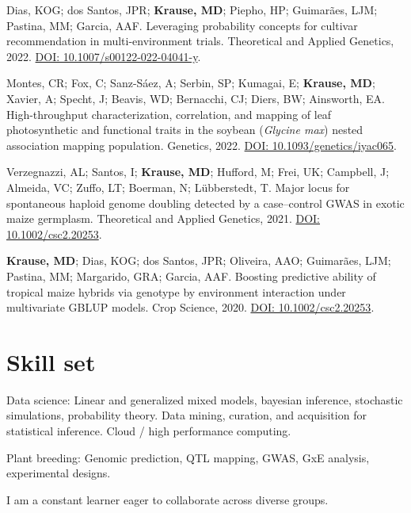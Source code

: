 \documentclass[]{mdkrause_cv_openfont}
\begin{document}
\begin{minipage}[t]{1\textwidth} 


Dias, KOG; dos Santos, JPR; \textbf{Krause, MD}; Piepho, HP; Guimarães, LJM; Pastina, MM; Garcia, AAF. Leveraging probability concepts for cultivar recommendation in multi-environment trials. Theoretical and Applied Genetics, 2022. \href{https://link.springer.com/article/10.1007/s00122-022-04041-y}{DOI: 10.1007/s00122-022-04041-y}. \ExternalLink 

\sectionsep
Montes, CR; Fox, C; Sanz-Sáez, A; Serbin, SP; Kumagai, E; \textbf{Krause, MD}; Xavier, A; Specht, J; Beavis, WD; Bernacchi, CJ; Diers, BW; Ainsworth, EA. High-throughput characterization, correlation, and mapping of leaf photosynthetic and functional traits in the soybean (\textit{Glycine max}) nested association mapping population. Genetics, 2022. \href{https://academic.oup.com/genetics/advance-article/doi/10.1093/genetics/iyac065/6572345?login=true}{DOI: 10.1093/genetics/iyac065}. \ExternalLink

\sectionsep
Verzegnazzi, AL; Santos, I; \textbf{Krause, MD}; Hufford, M; Frei, UK; Campbell, J; Almeida, VC; Zuffo, LT; Boerman, N; Lübberstedt, T. Major locus for spontaneous haploid genome doubling detected by a case–control GWAS in exotic maize germplasm. Theoretical and Applied Genetics, 2021. \href{https://link.springer.com/article/10.1007/s00122-021-03780-8}{DOI: 10.1002/csc2.20253}. \ExternalLink 

\sectionsep
\textbf{Krause, MD}; Dias, KOG; dos Santos, JPR; Oliveira, AAO; Guimarães, LJM; Pastina, MM; Margarido, GRA; Garcia, AAF. Boosting predictive ability of tropical maize hybrids via genotype by environment interaction under multivariate GBLUP models. Crop Science, 2020. \href{https://acsess.onlinelibrary.wiley.com/doi/full/10.1002/csc2.20253}{DOI: 10.1002/csc2.20253}. \ExternalLink 

\sectionsep


\section{Skill set}

\sectionsep

\begin{tightemize}
	\vspace{0.5 mm}
	\item Data science: Linear and generalized mixed models, bayesian inference, stochastic simulations, probability theory. Data mining, curation, and acquisition for statistical inference. Cloud / high performance computing.
	\item Plant breeding: Genomic prediction, QTL mapping, GWAS, GxE analysis, experimental designs.
	\item I am a constant learner eager to collaborate across diverse groups.
\end{tightemize}


\end{minipage}
\end{document}
